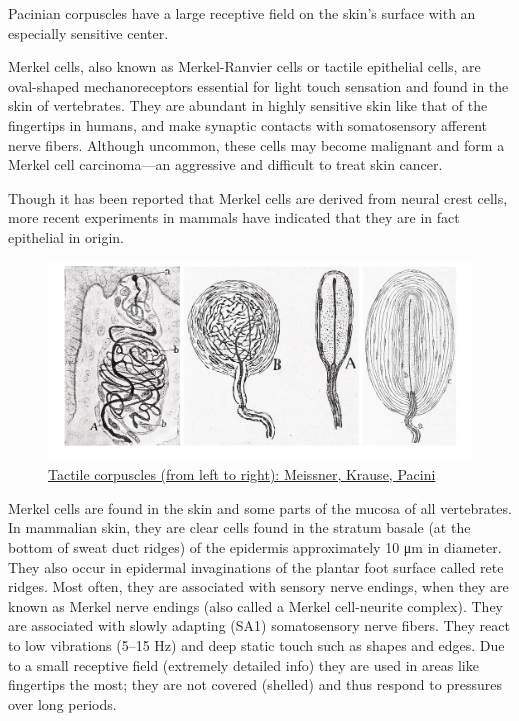 Pacinian corpuscles have a large receptive field on the skin's surface with an especially sensitive center.

Merkel cells, also known as Merkel-Ranvier cells or tactile epithelial cells, are oval-shaped mechanoreceptors essential for light touch sensation and found in the skin of vertebrates. They are abundant in highly sensitive skin like that of the fingertips in humans, and make synaptic contacts with somatosensory afferent nerve fibers. Although uncommon, these cells may become malignant and form a Merkel cell carcinoma---an aggressive and difficult to treat skin cancer.

Though it has been reported that Merkel cells are derived from neural crest cells, more recent experiments in mammals have indicated that they are in fact epithelial in origin.



\begin{figure}

{\centering \includegraphics[width=0.7\linewidth]{./figures/somatosensory/TouchReceptors} 

}

\caption{\href{https://commons.wikimedia.org/wiki/File:Gray940.png}{Tactile corpuscles (from left to right): Meissner, Krause, Pacini}}\label{fig:tactilecorpuscle}
\end{figure}

Merkel cells are found in the skin and some parts of the mucosa of all vertebrates. In mammalian skin, they are clear cells found in the stratum basale (at the bottom of sweat duct ridges) of the epidermis approximately 10 μm in diameter. They also occur in epidermal invaginations of the plantar foot surface called rete ridges. Most often, they are associated with sensory nerve endings, when they are known as Merkel nerve endings (also called a Merkel cell-neurite complex). They are associated with slowly adapting (SA1) somatosensory nerve fibers. They react to low vibrations (5--15 Hz) and deep static touch such as shapes and edges. Due to a small receptive field (extremely detailed info) they are used in areas like fingertips the most; they are not covered (shelled) and thus respond to pressures over long periods.

